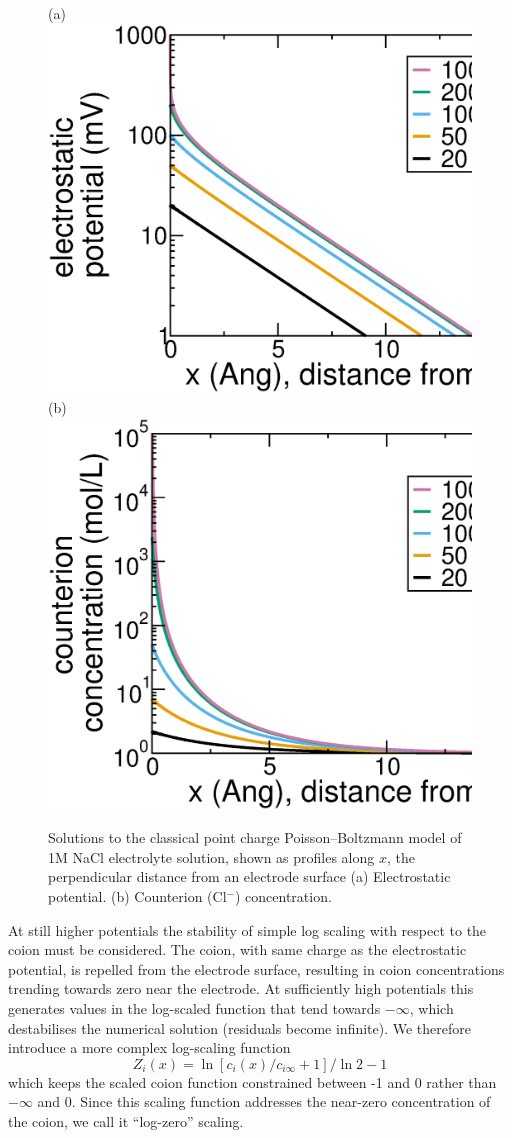 \begin{figure}
\centering
(a)
\includegraphics[width=0.45\linewidth]{counterion_potential.eps}
(b)
\includegraphics[width=0.45\linewidth]{counterion_logzero.eps}
\caption{\label{fig_classical_PB}Solutions to the classical point
  charge Poisson--Boltzmann model of 1M NaCl electrolyte solution,
  shown as profiles along $x$, the perpendicular distance from an
  electrode surface (a) Electrostatic potential. (b) Counterion
  ({Cl}$^{-}$) concentration. }
\end{figure}

At still higher potentials the stability of simple log scaling with
respect to the coion must be considered. The coion, with same charge
as the electrostatic potential, is repelled from the electrode surface,
resulting in coion concentrations trending towards zero near the electrode. At
sufficiently high potentials this generates values in the log-scaled
function that tend towards $-\infty$, which destabilises the numerical
solution (residuals become infinite). We therefore introduce a more complex log-scaling function
\begin{equation}
Z_i(x) = \ln\left[c_i(x)/c_{i\infty}+1\right]/\ln 2 - 1
\label{log_zero}
\end{equation}
which keeps the scaled coion function constrained between -1 and 0
rather than $-\infty$ and 0. Since this scaling function addresses the
near-zero concentration of the coion, we call it ``log-zero'' scaling.

